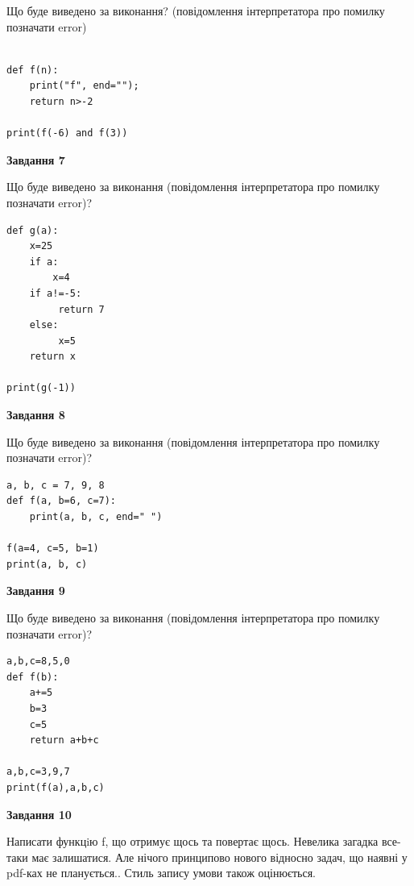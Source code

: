 \documentclass[12pt, ukrainian]{article}
\begin{document}
{\begin {large}
Що буде виведено за виконання? (повідомлення інтерпретатора про помилку позначати error)\par
\begin{verbatim}

def f(n):
    print("f", end="");
    return n>-2

print(f(-6) and f(3))
\end{verbatim}

{\begin {center}\textbf{Завдання 7}\end {center}}

Що буде виведено за виконання (повідомлення інтерпретатора про помилку позначати error)?\par
\begin{verbatim}
def g(a):
    x=25
    if a: 
        x=4
    if a!=-5:
         return 7
    else:
         x=5
    return x

print(g(-1))
\end{verbatim}

{\begin {center}\textbf{Завдання 8}\end {center}}

Що буде виведено за виконання (повідомлення інтерпретатора про помилку позначати error)?\par
\begin{verbatim}
a, b, c = 7, 9, 8
def f(a, b=6, c=7):
    print(a, b, c, end=" ")

f(a=4, c=5, b=1)
print(a, b, c)
\end{verbatim}

{\begin {center}\textbf{Завдання 9}\end {center}}

Що буде виведено за виконання (повідомлення інтерпретатора про помилку позначати error)?\par
\begin{verbatim}
a,b,c=8,5,0
def f(b):
    a+=5
    b=3
    c=5
    return a+b+c

a,b,c=3,9,7
print(f(a),a,b,c)
\end{verbatim}

{\begin {center}\textbf{Завдання 10}\end {center}}


Написати функцiю f, що отримує щось та повертає щось. Невелика загадка все-таки має залишатися. Але нічого принципово нового відносно задач, що наявні у pdf-ках не планується.. Стиль запису умови також оцінюється.\par
\end {large}}
\newpage
\end{document}
